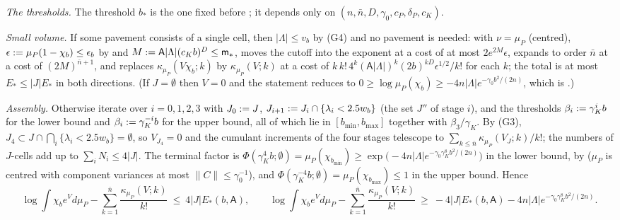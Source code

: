\emph{The thresholds.} The threshold $b_*$ is the one fixed before ; it depends only on $(n,\bar n,D,\gamma_0,c_P,\delta_P,c_K)$.

\emph{Small volume.} If some pavement consists of a single cell, then $|\Lambda|\le v_b$ by (G4) and no pavement is needed: with $\nu=\mu_P$ (centred), $\epsilon:=\mu_P(1-\chi_b)\le\epsilon_b$ by  and $M:=\mathsf A|\Lambda|(c_Kb)^D\le\mathsf m_*$,  moves the cutoff into the exponent at a cost of at most $2e^{2M}\epsilon$,  expands to order $\bar n$ at a cost of $(2M)^{\bar n+1}$, and  replaces $\kappa_{\mu_P}(V\chi_b;k)$ by $\kappa_{\mu_P}(V;k)$ at a cost of $k\,k!\,4^k(\mathsf A|\Lambda|)^k(2b)^{kD}\epsilon^{1/2}/k!$ for each $k$; the total is at most $E_*\le|J|E_*$ in both directions. (If $J=\emptyset$ then $V=0$ and the statement reduces to $0\ge\log\mu_P(\chi_b)\ge-4n|\Lambda|e^{-\gamma_0b^2/(2n)}$, which is .)

\emph{Assembly.} Otherwise iterate  over $i=0,1,2,3$ with $J_0:= J$, $J_{i+1}:= J_i\cap\{\lambda_i<2.5w_b\}$ (the set $J''$ of stage $i$), and the thresholds $\beta_i:=\gamma_K^ib$ for the lower bound and $\beta_i:=\gamma_K^{-i}b$ for the upper bound, all of which lie in $[b_{\min},b_{\max}]$ together with $\beta_3/\gamma_K$. By (G3), $J_4\subset J\cap\bigcap_i\{\lambda_i<2.5w_b\}=\emptyset$, so $V_{J_4}=0$ and the cumulant increments of the four stages telescope to $\sum_{k\le\bar n}\kappa_{\mu_P}(V_J;k)/k!$; the numbers of $J$-cells add up to $\sum_iN_i\le4|J|$. The terminal factor is $\Phi(\gamma_K^4b;\emptyset)=\mu_P(\chi_{b_{\min}})\ge\exp\big(-4n|\Lambda|e^{-\gamma_0\gamma_K^8b^2/(2n)}\big)$ in the lower bound, by  ($\mu_P$ is centred with component variances at most $\|C\|\le\gamma_0^{-1}$), and $\Phi(\gamma_K^{-4}b;\emptyset)=\mu_P(\chi_{b_{\max}})\le1$ in the upper bound. Hence
\[
\log\int\chi_be^Vd\mu_P-\sum_{k=1}^{\bar n}\frac{\kappa_{\mu_P}(V;k)}{k!}\ \le\ 4|J|E_*(b,\mathsf A),\qquad\log\int\chi_be^Vd\mu_P-\sum_{k=1}^{\bar n}\frac{\kappa_{\mu_P}(V;k)}{k!}\ \ge\ -4|J|E_*(b,\mathsf A)-4n|\Lambda|e^{-\gamma_0\gamma_K^8b^2/(2n)}.
\]

